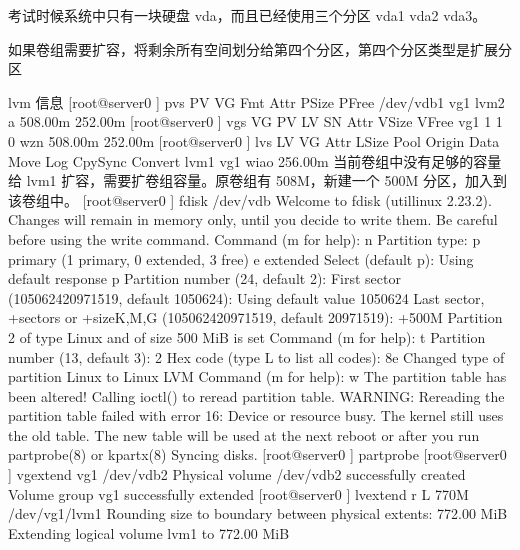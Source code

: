 \documentclass[letterpaper,10pt,english]{sphinxmanual}
\begin{document}
考试时候系统中只有一块硬盘 vda，而且已经使用三个分区 vda1 vda2 vda3。

如果卷组需要扩容，将剩余所有空间划分给第四个分区，第四个分区类型是扩展分区

%
\begin{sphinxVerbatim}[commandchars=\\\{\}]
lvm 信息
[root@server0 \PYGZti{}]\PYGZsh{} pvs
PV  VG      Fmt     Attr PSize      PFree
/dev/vdb1   vg1     lvm2 a\PYGZhy{}\PYGZhy{}        508.00m 252.00m
[root@server0 \PYGZti{}]\PYGZsh{} vgs
VG  \PYGZsh{}PV \PYGZsh{}LV \PYGZsh{}SN Attr        VSize   VFree vg1       1       1       0 wz\PYGZhy{}\PYGZhy{}n\PYGZhy{} 508.00m 252.00m
[root@server0 \PYGZti{}]\PYGZsh{} lvs
LV  VG      Attr    LSize   Pool Origin Data\PYGZpc{}       Move Log Cpy\PYGZpc{}Sync Convert
lvm1 vg1    \PYGZhy{}wi\PYGZhy{}ao\PYGZhy{}\PYGZhy{}\PYGZhy{}\PYGZhy{} 256.00m
当前卷组中没有足够的容量给 lvm1 扩容，需要扩卷组容量。原卷组有 508M，新建一个 500M 分区，加入到该卷组中。
[root@server0 \PYGZti{}]\PYGZsh{} fdisk /dev/vdb
Welcome to fdisk (util\PYGZhy{}linux 2.23.2).
Changes will remain in memory only, until you decide to write them. Be careful before using the write command.
Command (m for help): n
Partition type:
p   primary (1 primary, 0 extended, 3 free) e       extended
Select (default p):
Using default response p
Partition number (2\PYGZhy{}4, default 2):
First sector (1050624\PYGZhy{}20971519, default 1050624):
Using default value 1050624
Last sector, +sectors or +size\PYGZob{}K,M,G\PYGZcb{} (1050624\PYGZhy{}20971519, default 20971519): +500M
Partition 2 of type Linux and of size 500 MiB is set
Command (m for help): t
Partition number (1\PYGZhy{}3, default 3): 2
Hex code (type L to list all codes): 8e
Changed type of partition \PYGZsq{}Linux\PYGZsq{} to \PYGZsq{}Linux LVM\PYGZsq{}
Command (m for help): w
The partition table has been altered!
Calling ioctl() to re\PYGZhy{}read partition table.
WARNING: Re\PYGZhy{}reading the partition table failed with error 16: Device or resource busy. The kernel still uses the old table. The new table will be used at the next reboot or after you run partprobe(8) or kpartx(8) Syncing disks.
[root@server0 \PYGZti{}]\PYGZsh{} partprobe
[root@server0 \PYGZti{}]\PYGZsh{} vgextend vg1 /dev/vdb2
Physical volume \PYGZdq{}/dev/vdb2\PYGZdq{} successfully created
Volume group \PYGZdq{}vg1\PYGZdq{} successfully extended
[root@server0 \PYGZti{}]\PYGZsh{} lvextend \PYGZhy{}r \PYGZhy{}L 770M /dev/vg1/lvm1
Rounding size to boundary between physical extents: 772.00 MiB
Extending logical volume lvm1 to 772.00 MiB

\end{sphinxVerbatim}
\end{document}
